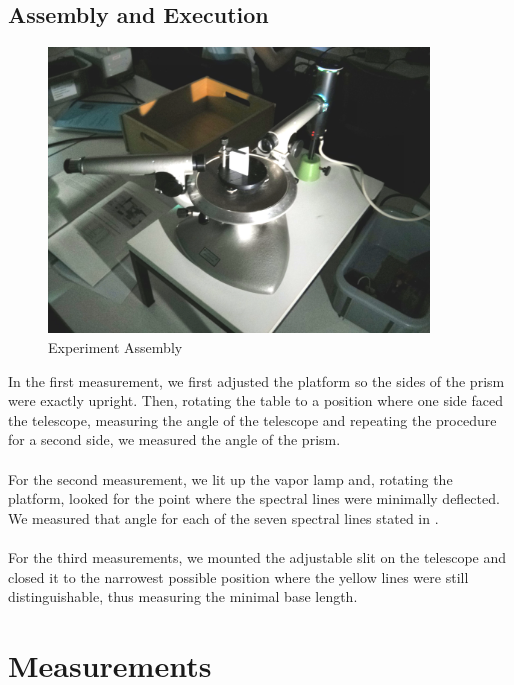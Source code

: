 \documentclass{scrreprt}
\begin{document}
\subsection{Assembly and Execution}

\begin{figure}[H]
	\centering
  \includegraphics[width=0.9\textwidth]{img/assembly.jpg}
	\caption{Experiment Assembly}
	\label{fig:assembly}
\end{figure}

In the first measurement, we first adjusted the platform so the sides of the prism were exactly upright. Then, rotating the table to a position where one side faced the telescope, measuring the angle of the telescope and repeating the procedure for a second side, we measured the angle of the prism.
\\\\
For the second measurement, we lit up the vapor lamp and, rotating the platform, looked for the point where the spectral lines were minimally deflected. We measured that angle for each of the seven spectral lines stated in \cite[p. 159]{physcript13}. 
\\\\
For the third measurements, we mounted the adjustable slit on the telescope and closed it to the narrowest possible position where the yellow lines were still distinguishable, thus measuring the minimal base length. 
\section{Measurements}
\end{document}
